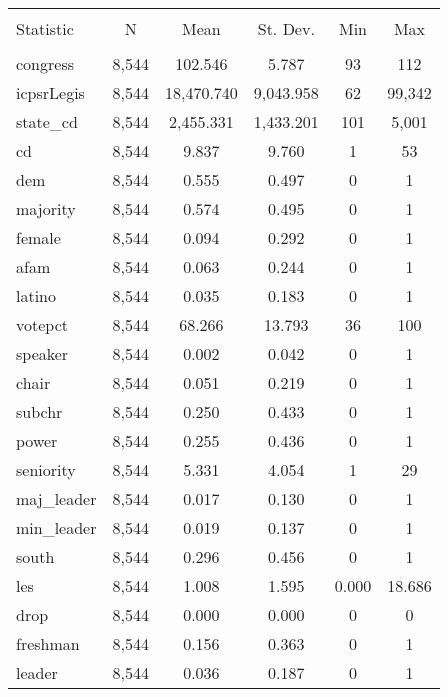 \documentclass[12pt]{article}
\begin{document}
\begin{table}[H] \centering 
	\caption{} 
	\label{} 
	\begin{tabular}{@{\extracolsep{5pt}}lccccc} 
		\\[-1.8ex]\hline 
		\hline \\[-1.8ex] 
		Statistic & \multicolumn{1}{c}{N} & \multicolumn{1}{c}{Mean} & \multicolumn{1}{c}{St. Dev.} & \multicolumn{1}{c}{Min} & \multicolumn{1}{c}{Max} \\ 
		\hline \\[-1.8ex] 
		congress & 8,544 & 102.546 & 5.787 & 93 & 112 \\ 
		icpsrLegis & 8,544 & 18,470.740 & 9,043.958 & 62 & 99,342 \\ 
		state\_cd & 8,544 & 2,455.331 & 1,433.201 & 101 & 5,001 \\ 
		cd & 8,544 & 9.837 & 9.760 & 1 & 53 \\ 
		dem & 8,544 & 0.555 & 0.497 & 0 & 1 \\ 
		majority & 8,544 & 0.574 & 0.495 & 0 & 1 \\ 
		female & 8,544 & 0.094 & 0.292 & 0 & 1 \\ 
		afam & 8,544 & 0.063 & 0.244 & 0 & 1 \\ 
		latino & 8,544 & 0.035 & 0.183 & 0 & 1 \\ 
		votepct & 8,544 & 68.266 & 13.793 & 36 & 100 \\ 
		speaker & 8,544 & 0.002 & 0.042 & 0 & 1 \\ 
		chair & 8,544 & 0.051 & 0.219 & 0 & 1 \\ 
		subchr & 8,544 & 0.250 & 0.433 & 0 & 1 \\ 
		power & 8,544 & 0.255 & 0.436 & 0 & 1 \\ 
		seniority & 8,544 & 5.331 & 4.054 & 1 & 29 \\ 
		maj\_leader & 8,544 & 0.017 & 0.130 & 0 & 1 \\ 
		min\_leader & 8,544 & 0.019 & 0.137 & 0 & 1 \\ 
		south & 8,544 & 0.296 & 0.456 & 0 & 1 \\ 
		les & 8,544 & 1.008 & 1.595 & 0.000 & 18.686 \\ 
		drop & 8,544 & 0.000 & 0.000 & 0 & 0 \\ 
		freshman & 8,544 & 0.156 & 0.363 & 0 & 1 \\ 
		leader & 8,544 & 0.036 & 0.187 & 0 & 1 \\ 

\end{tabular}
\end{table}
\end{document}
